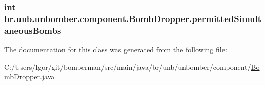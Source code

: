 \hypertarget{classbr_1_1unb_1_1unbomber_1_1component_1_1_bomb_dropper_a69e0a914f0a36bac6ee0e17ad1d877c5}{
\subsubsection[{permitted\+Simultaneous\+Bombs}]{\setlength{\rightskip}{0pt plus 5cm}int br.\+unb.\+unbomber.\+component.\+Bomb\+Dropper.\+permitted\+Simultaneous\+Bombs\hspace{0.3cm}{\ttfamily [private]}}}\label{classbr_1_1unb_1_1unbomber_1_1component_1_1_bomb_dropper_a69e0a914f0a36bac6ee0e17ad1d877c5}


The documentation for this class was generated from the following file\+:\begin{DoxyCompactItemize}
\item 
C\+:/\+Users/\+Igor/git/bomberman/src/main/java/br/unb/unbomber/component/\hyperlink{_bomb_dropper_8java}{Bomb\+Dropper.\+java}\end{DoxyCompactItemize}
